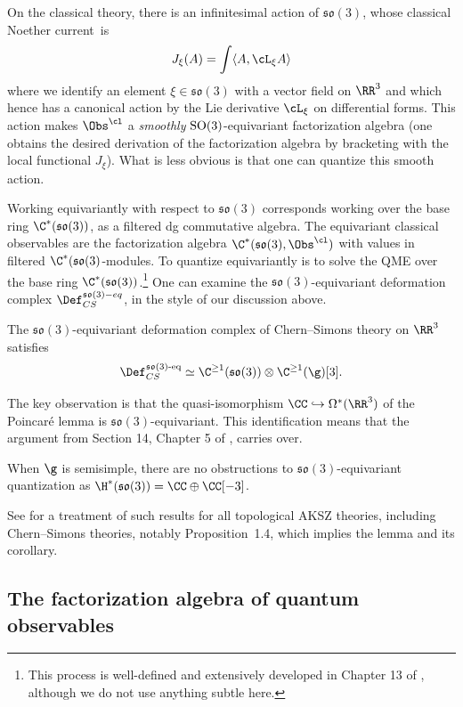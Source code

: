 \documentclass[10pt]{amsart}
\begin{document}
On the classical theory, 
there is an infinitesimal action of $\mathfrak{so}(3)$,
whose classical Noether current~is
\[
J_\xi(A) = \int \langle A, \cL_\xi A \rangle
\]
where we identify an element $\xi \in \mathfrak{so}(3)$ with a vector field on $\RR^3$ 
and which hence has a canonical action by the Lie derivative $\cL_\xi$ on differential forms.
This action makes $\Obs^\cl$ a {\em smoothly} ${\rm SO}(3)$-equivariant factorization algebra 
(one obtains the desired derivation of the factorization algebra by bracketing with the local functional $J_\xi$).
What is less obvious is that one can quantize this smooth action.

Working equivariantly with respect to $\mathfrak{so}(3)$ corresponds working over the base ring $\C^*(\mathfrak{so}(3))$, as a filtered dg commutative algebra.
The equivariant classical observables are the factorization algebra $\C^*(\mathfrak{so}(3), \Obs^\cl)$ with values in filtered $\C^*(\mathfrak{so}(3)$-modules.
To quantize equivariantly is to solve the QME over the base ring $\C^*(\mathfrak{so}(3))$.\footnote{This process is well-defined and extensively developed in Chapter 13 of \cite{CG2},
although we do not use anything subtle here.}
One can examine the $\mathfrak{so}(3)$-equivariant deformation complex $\Def^{\mathfrak{so}(3)-eq}_{CS}$,
in the style of our discussion above.

\begin{lmm}
The $\mathfrak{so}(3)$-equivariant deformation complex of Chern--Simons theory on $\RR^3$ satisfies
\[
\Def^{\mathfrak{so}(3)\text{-eq}}_{CS} \simeq \C^{\geq 1}(\mathfrak{so}(3)) \otimes \C^{\geq 1}(\g)[3].
\]
\end{lmm}

The key observation is that the quasi-isomorphism $\CC \hookrightarrow \Omega^*(\RR^3)$ of the Poincar\'e lemma is $\mathfrak{so}(3)$-equivariant.
This identification means that the argument from Section 14, Chapter 5 of \cite{CosBook}, carries over.

\begin{crl}
When $\g$ is semisimple, there are no obstructions to $\mathfrak{so}(3)$-equivariant quantization as $\H^*(\mathfrak{so}(3)) = \CC \oplus \CC[-3]$.
\end{crl}

See \cite{EllGwi} for a treatment of such results for all topological AKSZ theories, including Chern--Simons theories, notably Proposition~1.4, which implies the lemma and its corollary.

\subsection{The factorization algebra of quantum observables}
\label{subsec: quantum observables}
\end{document}
